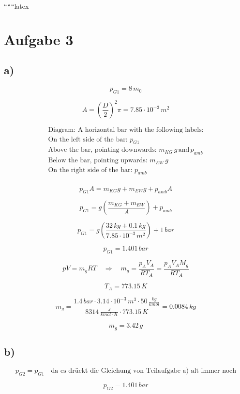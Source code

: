 
``````latex


\section*{Aufgabe 3}

\subsection*{a)}

\[
p_{G1} = 8 \, m_0
\]

\[
A = \left( \frac{D}{2} \right)^2 \pi = 7.85 \cdot 10^{-3} \, m^2
\]

\[
\begin{array}{c}
\text{Diagram: A horizontal bar with the following labels:} \\
\text{On the left side of the bar: } p_{G1} \\
\text{Above the bar, pointing downwards: } m_{KG} \, g \, \text{and} \, p_{amb} \\
\text{Below the bar, pointing upwards: } m_{EW} \, g \\
\text{On the right side of the bar: } p_{amb} \\
\end{array}
\]

\[
p_{G1} A = m_{KG} g + m_{EW} g + p_{amb} A
\]

\[
p_{G1} = g \left( \frac{m_{KG} + m_{EW}}{A} \right) + p_{amb}
\]

\[
p_{G1} = g \left( \frac{32 \, kg + 0.1 \, kg}{7.85 \cdot 10^{-3} \, m^2} \right) + 1 \, bar
\]

\[
p_{G1} = 1.401 \, bar
\]

\[
pV = m_g R T \quad \Rightarrow \quad m_g = \frac{p_A V_A}{R T_A} = \frac{p_A V_A M_g}{R T_A}
\]

\[
T_A = 773.15 \, K
\]

\[
m_g = \frac{1.4 \, bar \cdot 3.14 \cdot 10^{-3} \, m^3 \cdot 50 \, \frac{kg}{kmol}}{8314 \, \frac{J}{kmol \cdot K} \cdot 773.15 \, K} = 0.0084 \, kg
\]

\[
m_g = 3.42 \, g
\]

\subsection*{b)}

\[
p_{G2} = p_{G1} \quad \text{da es drückt die Gleichung von Teilaufgabe a) alt immer noch}
\]

\[
p_{G2} = 1.401 \, bar
\]

